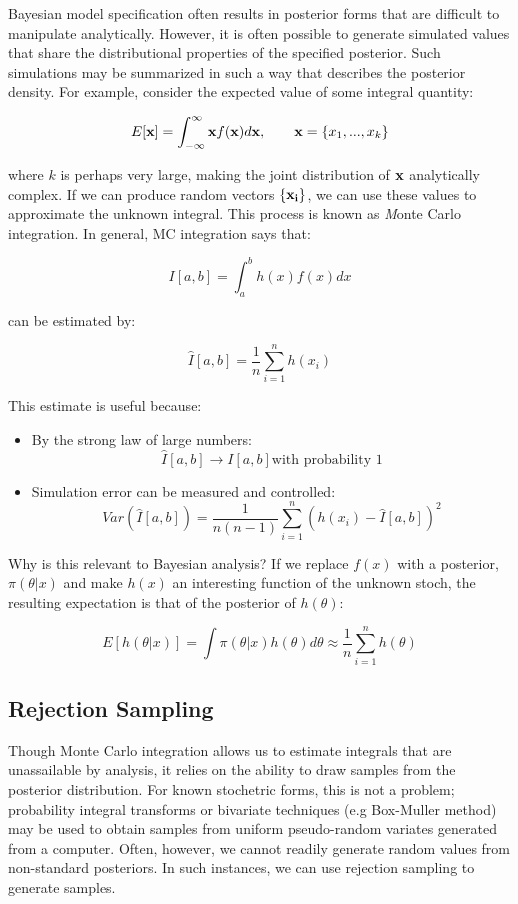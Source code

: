 \documentclass[]{book}
\begin{document}
Bayesian model specification often results in posterior forms that are difficult to manipulate analytically. However, it is often possible to generate simulated values that share the distributional properties of the specified posterior. Such simulations may be summarized in such a way that describes the posterior density. For example, consider the expected value of some integral quantity:

\[
E[{\bf x}] = \int_{-\infty}^{\infty} {\bf x} f({\bf x}) d{\bf x}, \qquad
{\bf x} = \{x_1,...,x_k\}
\]

\noindent where $k$ is perhaps very large, making the joint distribution of ${\bf x}$ analytically complex. If we can produce random vectors $\{{\bf x_i}\}$, we can use these values to approximate the unknown integral. This process is known as {\emph Monte Carlo integration}. In general, MC integration says that:

\[
I[a,b] = \int_a^b h(x) f(x) dx
\]

\noindent can be estimated by:

\[
\hat{I}[a,b] = \frac{1}{n}\sum_{i=1}^n h(x_i)
\]

\noindent This estimate is useful because:

\begin{itemize}
\item
By the strong law of large numbers:
\[\hat{I}[a,b] \rightarrow I[a,b] \mbox{with probability 1}\]
\item
Simulation error can be measured and controlled:
\[Var(\hat{I}[a,b]) = \frac{1}{n(n-1)}\sum_{i=1}^n (h(x_i)-\hat{I}[a,b])^2\]
\end{itemize}

Why is this relevant to Bayesian analysis? If we replace $f(x)$ with a posterior, $\pi(\theta|x)$ and make $h(x)$ an interesting function of the unknown stoch, the resulting expectation is that of the posterior of $h(\theta)$:

\[
E[h(\theta|x)] = \int \pi(\theta|x) h(\theta) d\theta \approx \frac{1}{n}\sum_{i=1}^n h(\theta)
\]

\subsection{Rejection Sampling}

Though Monte Carlo integration allows us to estimate integrals that are unassailable by analysis, it relies on the ability to draw samples from the posterior distribution. For known stochetric forms, this is not a problem; probability integral transforms or bivariate techniques (e.g Box-Muller method) may be used to obtain samples from uniform pseudo-random variates generated from a computer. Often, however, we cannot readily generate random values from non-standard posteriors. In such instances, we can use rejection sampling to generate samples.
\end{document}
